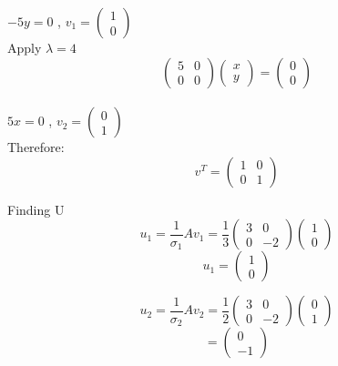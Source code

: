 \documentclass[12pt, oneside]{article}   	%
\begin{document}
\begin{enumerate}
	$-5y=0$ , $v_1= \left( \begin{array}{c} 1 \\ 0  \end{array} \right)$\\
	
	Apply $\lambda= 4$\\
	$$\left( \begin{array}{cc} 5 & 0 \\ 0 & 0 \end{array} \right) \left( \begin{array}{c} x \\ y \end{array} \right) =\left( \begin{array}{c} 0 \\ 0  \end{array} \right)$$ \\
	
	$5x=0$ , $v_2= \left( \begin{array}{c} 0 \\ 1  \end{array} \right)$\\
	Therefore: $$v^T=\left( \begin{array}{cc}1& 0 \\0& 1  \end{array} \right)$$
	
	Finding U
	$$u_1= \frac{1}{\sigma_1}Av_1= \frac{1}{3}\left( \begin{array}{cc} 3&0 \\ 0& -2  \end{array} \right)\left( \begin{array}{c} 1 \\ 0  \end{array} \right)$$
	$$u_1= \left( \begin{array}{c} 1 \\ 0  \end{array} \right)$$
	
	$$u_2= \frac{1}{\sigma_2}Av_2= \frac{1}{2}\left( \begin{array}{cc} 3&0 \\ 0& -2  \end{array} \right)\left( \begin{array}{c} 0 \\ 1  \end{array} \right)$$
	$$= \left( \begin{array}{c} 0 \\ -1  \end{array} \right)$$
	

\end{enumerate}
\end{document}

